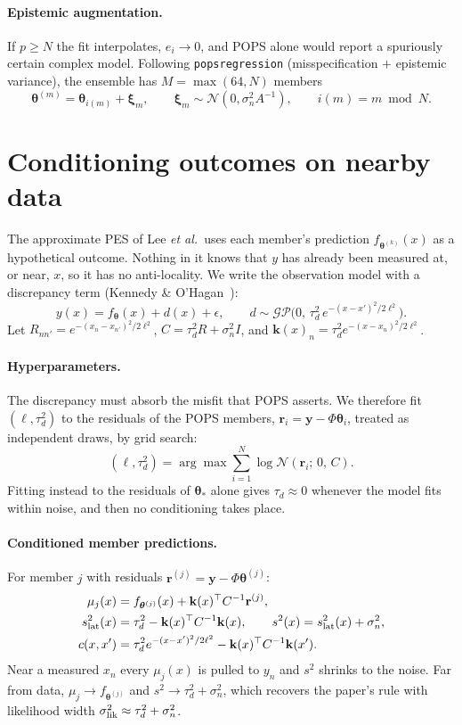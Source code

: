 \documentclass[11pt,a4paper]{article}
\newcommand{\N}{\mathcal{N}}
\newcommand{\btheta}{\bm{\theta}}
\newcommand{\by}{\mathbf{y}}
\newcommand{\br}{\mathbf{r}}
\newcommand{\bk}{\mathbf{k}}
\begin{document}
\paragraph{Epistemic augmentation.} If $p\ge N$ the fit interpolates, $e_i\to 0$, and POPS alone would report a spuriously certain
complex model. Following \texttt{popsregression} (misspecification $+$ epistemic variance), the ensemble has
$M=\max(64,N)$ members
\begin{equation}
\btheta^{(m)} = \btheta_{i(m)} + \bm\xi_m,\qquad \bm\xi_m\sim\N(0,\sigma_n^2A^{-1}),\qquad i(m) = m \bmod N .
\end{equation}

\section{Conditioning outcomes on nearby data}
\label{sec:disc}
The approximate PES of Lee \emph{et al.}\ uses each member's prediction $f_{\btheta^{(k)}}(x)$ as a hypothetical outcome. Nothing in it
knows that $y$ has already been measured at, or near, $x$, so it has no anti-locality. We write the observation model with a
discrepancy term (Kennedy \& O'Hagan~\cite{ko2001}):
\begin{equation}
y(x) = f_{\btheta}(x) + d(x) + \epsilon,\qquad d\sim\mathcal{GP}\bigl(0,\,\tau_d^2\,e^{-(x-x')^2/2\ell^2}\bigr).
\end{equation}
Let $R_{nn'} = e^{-(x_n-x_{n'})^2/2\ell^2}$, $C = \tau_d^2R + \sigma_n^2 I$, and $\bk(x)_n = \tau_d^2e^{-(x-x_n)^2/2\ell^2}$.

\paragraph{Hyperparameters.} The discrepancy must absorb the misfit that POPS asserts. We therefore fit $(\ell,\tau_d^2)$ to the
residuals of the POPS members, $\br_i = \by - \Phi\btheta_i$, treated as independent draws, by grid search:
\begin{equation}
(\ell,\tau_d^2) = \arg\max \sum_{i=1}^{N}\log\N(\br_i;\,0,\,C).
\end{equation}
Fitting instead to the residuals of $\btheta_*$ alone gives $\tau_d\approx 0$ whenever the model fits within noise, and then no
conditioning takes place.

\paragraph{Conditioned member predictions.} For member $j$ with residuals $\br^{(j)} = \by - \Phi\btheta^{(j)}$:
\begin{align}
\mu_j(x) &= f_{\btheta^{(j)}}(x) + \bk(x)^\top C^{-1}\br^{(j)},\\
s^2_{\rm lat}(x) &= \tau_d^2 - \bk(x)^\top C^{-1}\bk(x),\qquad s^2(x) = s^2_{\rm lat}(x) + \sigma_n^2,\\
c(x,x') &= \tau_d^2 e^{-(x-x')^2/2\ell^2} - \bk(x)^\top C^{-1}\bk(x').
\end{align}
Near a measured $x_n$ every $\mu_j(x)$ is pulled to $y_n$ and $s^2$ shrinks to the noise. Far from data, $\mu_j\to f_{\btheta^{(j)}}$
and $s^2\to\tau_d^2+\sigma_n^2$, which recovers the paper's rule with likelihood width $\sigma^2_{\rm lik}\approx\tau_d^2+\sigma_n^2$.
\end{document}

